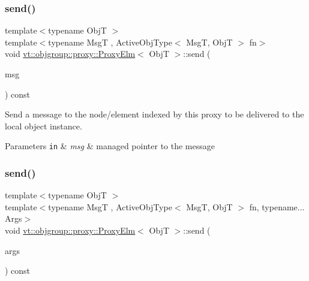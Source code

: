 \subsubsection{\texorpdfstring{send()}{send()}\hspace{0.1cm}{\footnotesize\ttfamily [2/3]}}
{\footnotesize\ttfamily template$<$typename ObjT $>$ \\
template$<$typename MsgT , Active\+Obj\+Type$<$ Msg\+T, Obj\+T $>$ fn$>$ \\
void \hyperlink{structvt_1_1objgroup_1_1proxy_1_1_proxy_elm}{vt\+::objgroup\+::proxy\+::\+Proxy\+Elm}$<$ ObjT $>$\+::send (\begin{DoxyParamCaption}\item[{\hyperlink{namespacevt_ab2b3d506ec8e8d1540aede826d84a239}{Msg\+Shared\+Ptr}$<$ MsgT $>$}]{msg }\end{DoxyParamCaption}) const}



Send a message to the node/element indexed by this proxy to be delivered to the local object instance. 


\begin{DoxyParams}[1]{Parameters}
\mbox{\tt in}  & {\em msg} & managed pointer to the message \\
\hline
\end{DoxyParams}
\mbox{\label{structvt_1_1objgroup_1_1proxy_1_1_proxy_elm_aadfbb21b80482657fd2a7eba65ad7b48}} 
\subsubsection{\texorpdfstring{send()}{send()}\hspace{0.1cm}{\footnotesize\ttfamily [3/3]}}
{\footnotesize\ttfamily template$<$typename ObjT $>$ \\
template$<$typename MsgT , Active\+Obj\+Type$<$ Msg\+T, Obj\+T $>$ fn, typename... Args$>$ \\
void \hyperlink{structvt_1_1objgroup_1_1proxy_1_1_proxy_elm}{vt\+::objgroup\+::proxy\+::\+Proxy\+Elm}$<$ ObjT $>$\+::send (\begin{DoxyParamCaption}\item[{Args \&\&...}]{args }\end{DoxyParamCaption}) const}



